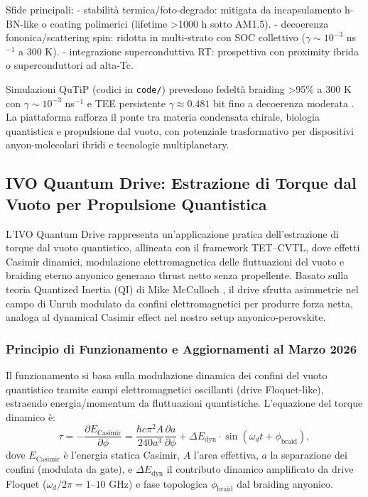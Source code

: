 \documentclass[11pt,a4paper]{article}
\let\oldcite\cite
\renewcommand{\cite}{\protect\oldcite}
\theoremstyle{plain}
\theoremstyle{definition}
\begin{document}
Sfide principali:
- stabilità termica/foto-degrado: mitigata da incapsulamento h-BN-like o coating polimerici (lifetime >1000 h sotto AM1.5).
- decoerenza fononica/scattering spin: ridotta in multi-strato con SOC collettivo ($\gamma \sim 10^{-3}$ ns$^{-1}$ a 300 K).
- integrazione superconduttiva RT: prospettiva con proximity ibrida o superconduttori ad alta-Tc.

Simulazioni QuTiP (codici in \texttt{code/}) prevedono fedeltà braiding >95\% a 300 K con $\gamma \sim 10^{-3}$ ns$^{-1}$ e TEE persistente $\gamma \approx 0.481$ bit fino a decoerenza moderata \cite{kitaev2006topological, levin2006detecting}. La piattaforma rafforza il ponte tra materia condensata chirale, biologia quantistica e propulsione dal vuoto, con potenziale trasformativo per dispositivi anyon-molecolari ibridi e tecnologie multiplanetary.

\vspace{0.4cm}










\subsection{IVO Quantum Drive: Estrazione di Torque dal Vuoto per Propulsione Quantistica}

L'IVO Quantum Drive rappresenta un'applicazione pratica dell'estrazione di torque dal vuoto quantistico, allineata con il framework TET--CVTL, dove effetti Casimir dinamici, modulazione elettromagnetica delle fluttuazioni del vuoto e braiding eterno anyonico generano thrust netto senza propellente. Basato sulla teoria Quantized Inertia (QI) di Mike McCulloch \cite{mcculloch2017quantized}, il drive sfrutta asimmetrie nel campo di Unruh modulato da confini elettromagnetici per produrre forza netta, analoga al dynamical Casimir effect nel nostro setup anyonico-perovskite.
\vspace{0.3cm}

\subsubsection{Principio di Funzionamento e Aggiornamenti al Marzo 2026}

Il funzionamento si basa sulla modulazione dinamica dei confini del vuoto quantistico tramite campi elettromagnetici oscillanti (drive Floquet-like), estraendo energia/momentum da fluttuazioni quantistiche. L'equazione del torque dinamico è:
\begin{equation}
\tau = -\frac{\partial E_{\mathrm{Casimir}}}{\partial \phi} = \frac{\hbar c \pi^2 A}{240 a^3} \frac{\partial a}{\partial \phi} + \Delta E_{\mathrm{dyn}} \cdot \sin(\omega_d t + \phi_{\mathrm{braid}}),
\label{eq:vacuum_torque}
\end{equation}
dove $E_{\mathrm{Casimir}}$ è l'energia statica Casimir, $A$ l'area effettiva, $a$ la separazione dei confini (modulata da gate), e $\Delta E_{\mathrm{dyn}}$ il contributo dinamico amplificato da drive Floquet ($\omega_d / 2\pi = 1$--$10$ GHz) e fase topologica $\phi_{\mathrm{braid}}$ dal braiding anyonico.
\end{document}
